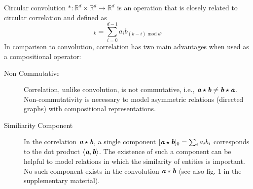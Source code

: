 \documentclass[letterpaper]{article}
\renewcommand{\vec}[1]{\textit{\textbf{#1}}}
\newcommand{\va}{\vec{a}}
\newcommand{\vb}{\vec{b}}
\newcommand{\cconv}{\ast}
\newcommand{\ccorr}{\star}
\newcommand{\R}{\mathbb{R}}
\begin{document}
Circular convolution $\cconv : \R^d \times \R^d \to \R^d$ is an operation that
is closely related to circular correlation and defined as
\begin{equation}
  [\vec{a} \cconv \vec{b}]_k = \sum_{i=0}^{d-1} a_i b_{(k - i) \operatorname{mod} d} .
  \label{eq:cconv}
\end{equation}
In comparison to convolution, correlation has two main advantages when used as a
compositional operator:
\begin{description}
\item[Non Commutative] Correlation, unlike convolution, is not commutative,
  i.e., $\va \ccorr \vb \neq \vb \ccorr \va$. Non-commutativity is necessary to
  model asymmetric relations (directed graphs) with compositional representations.
\item[Similiarity Component] In the correlation $\va \ccorr \vb$, a single
  component $[\va \ccorr \vb]_0 = \sum_i {a_i}{b_i}$ corresponds to the dot product $\langle
  \va, \vb \rangle$. The existence of such a component can be helpful to model
  relations in which the similarity of entities is important. No
  such component exists in the convolution $\va \cconv \vb$ (see also fig. 1 in the
  supplementary material).
\end{description}
\end{document}
